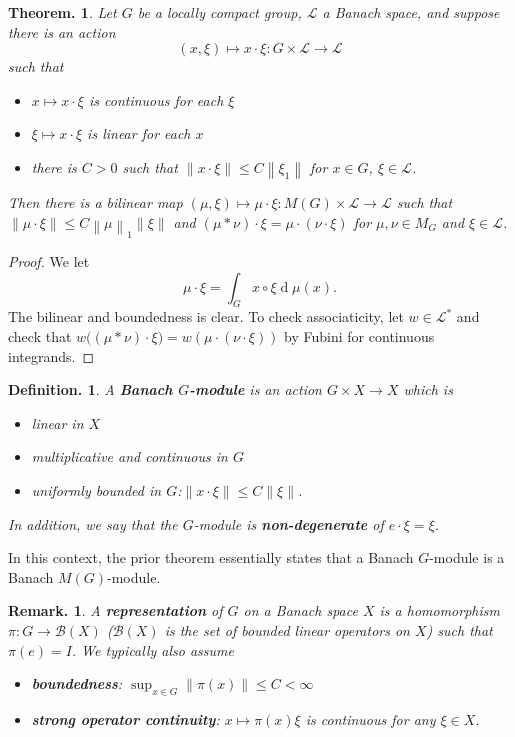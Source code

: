 \documentclass[11pt, a4paper]{memoir}
\newcommand{\norm}[1]{\ensuremath{\left\lVert#1\right\rVert}}
\theoremstyle{change}
\newtheorem{theorem}{Theorem.}[section]
\theoremstyle{plain}
\theoremstyle{nonumberplain}
\newtheorem{definition}{Definition.}
\newtheorem{remark}{Remark.}
\newtheorem{proof}{Proof}
\renewcommand{\d}[1]{\ensuremath{\operatorname{d}\!{#1}}}
\newcommand{\defn}[1]{{\boldmath\bfseries #1}}
\numberwithin{equation}{section}
\begin{document}
\begin{theorem}
    Let $G$ be a locally compact group, $\mathcal{L}$ a Banach space, and suppose there is an action
    \begin{equation*}
        (x,\xi)\mapsto x\cdot\xi:G\times\mathcal{L}\to\mathcal{L}
    \end{equation*}
    such that
    \begin{itemize}[nl]
        \item $x\mapsto x\cdot\xi$ is continuous for each $\xi$
        \item $\xi\mapsto x\cdot\xi$ is linear for each $x$
        \item there is $C>0$ such that $\norm{x\cdot\xi}\leq C\norm{\xi_1}$ for $x\in G$, $\xi\in\mathcal{L}$.
    \end{itemize}
    Then there is a bilinear map $(\mu,\xi)\mapsto\mu\cdot\xi:M(G)\times\mathcal{L}\to\mathcal{L}$ such that $\norm{\mu\cdot\xi}\leq C\norm{\mu}_1\norm{\xi}$ and $(\mu*\nu)\cdot\xi=\mu\cdot(\nu\cdot\xi)$ for $\mu,\nu\in M_G$ and $\xi\in\mathcal{L}$.
\end{theorem}
\begin{proof}
    We let
    \begin{equation*}
        \mu\cdot\xi=\int_G x\circ\xi\d{\mu(x)}.
    \end{equation*}
    The bilinear and boundedness is clear.
    To check associaticity, let $w\in\mathcal{L}^*$ and check that $w\bigl((\mu*\nu)\cdot\xi\bigr)=w(\mu\cdot(\nu\cdot\xi))$ by Fubini for continuous integrands.
\end{proof}
\begin{definition}
    A \defn{Banach $G$-module} is an action $G\times X\to X$ which is
    \begin{itemize}[nl]
        \item linear in $X$
        \item multiplicative and continuous in $G$
        \item uniformly bounded in $G$:$ \norm{x\cdot\xi}\leq C\norm{\xi}$.
    \end{itemize}
    In addition, we say that the $G$-module is \defn{non-degenerate} of $e\cdot\xi=\xi$.
\end{definition}
In this context, the prior theorem essentially states that a Banach $G$-module is a Banach $M(G)$-module.
\begin{remark}
    A \defn{representation} of $G$ on a Banach space $X$ is a homomorphism $\pi:G\to\mathcal{B}(X)$ ($\mathcal{B}(X)$ is the set of bounded linear operators on $X$) such that $\pi(e)=I$.
    We typically also assume
    \begin{itemize}[nl]
        \item \defn{boundedness}: $\sup_{x\in G}\norm{\pi(x)}\leq C<\infty$
        \item \defn{strong operator continuity}: $x\mapsto\pi(x)\xi$ is continuous for any $\xi\in X$.
    \end{itemize}
\end{remark}
\end{document}
